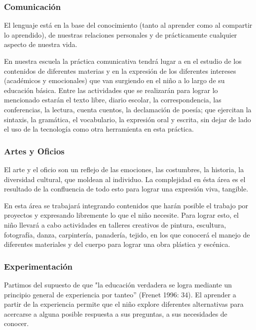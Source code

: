\documentclass[10pt,letterpaper,oneside]{book}
\begin{document}
\subsubsection{Comunicación}

El lenguaje está en la base del conocimiento (tanto al aprender como al compartir lo aprendido), de nuestras relaciones personales y de prácticamente cualquier aspecto de nuestra vida. 

En nuestra escuela la práctica comunicativa tendrá lugar a en el estudio de los contenidos de diferentes materias y en la expresión de los diferentes intereses (académicos y emocionales) que van surgiendo en el niño a lo largo de su educación básica.  Entre las actividades que se realizarán para lograr lo mencionado estarán el texto libre, diario escolar, la correspondencia, las conferencias, la lectura, cuenta cuentos, la declamación de poesía;  que ejercitan la sintaxis, la gramática, el vocabulario, la expresión oral y escrita, sin dejar de lado el uso de la tecnología como otra herramienta en esta práctica. 

\subsubsection{Artes y Oficios}

El arte y el oficio son un reflejo de las emociones, las costumbres, la historia, la diversidad cultural, que moldean al individuo. La complejidad en ésta área es el resultado de la confluencia de todo esto para lograr una expresión viva, tangible.

En esta área se trabajará integrando contenidos que harán posible el trabajo por proyectos y expresando libremente lo que el niño necesite. Para lograr esto, el niño llevará a cabo actividades en talleres creativos de pintura, escultura, fotografía, danza, carpintería, panadería, tejido, en los que conocerá el manejo de diferentes materiales y del cuerpo para lograr una obra plástica y escénica.  

\subsubsection{Experimentación}

Partimos del supuesto de que "la educación verdadera se logra mediante un principio general de experiencia por tanteo” (Frenet 1996: 34). El aprender a partir de la experiencia permite que el niño explore diferentes alternativas para acercarse a alguna posible respuesta a sus preguntas, a sus necesidades de conocer. 
\end{document}
